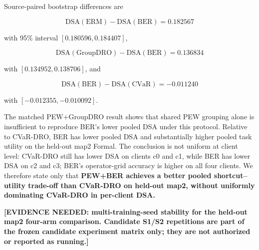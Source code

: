 \documentclass[10pt,twocolumn]{article}
\begin{document}
\begin{table}[t]
\centering
\small
\caption{Held-out map2 matched control comparison.}
\label{tab:auto2}
\end{table}

Source-paired bootstrap differences are

\[
\mathrm{DSA(ERM)}-\mathrm{DSA(BER)}=0.182567
\]

with 95\% interval \([0.180596,0.184407]\),

\[
\mathrm{DSA(GroupDRO)}-\mathrm{DSA(BER)}=0.136834
\]

with \([0.134952,0.138706]\), and

\[
\mathrm{DSA(BER)}-\mathrm{DSA(CVaR)}=-0.011240
\]

with \([-0.012355,-0.010092]\).

The matched PEW+GroupDRO result shows that shared PEW grouping alone is insufficient to reproduce BER's lower pooled DSA under this protocol. Relative to CVaR-DRO, BER has lower pooled DSA and substantially higher pooled task utility on the held-out map2 Formal. The conclusion is not uniform at client level: CVaR-DRO still has lower DSA on clients c0 and c1, while BER has lower DSA on c2 and c3; BER's operator-grid accuracy is higher on all four clients. We therefore state only that \textbf{PEW+BER achieves a better pooled shortcut--utility trade-off than CVaR-DRO on held-out map2, without uniformly dominating CVaR-DRO in per-client DSA.}

\textbf{[EVIDENCE NEEDED: multi-training-seed stability for the held-out map2 four-arm comparison. Candidate S1/S2 repetitions are part of the frozen candidate experiment matrix only; they are not authorized or reported as running.]}
\end{document}

